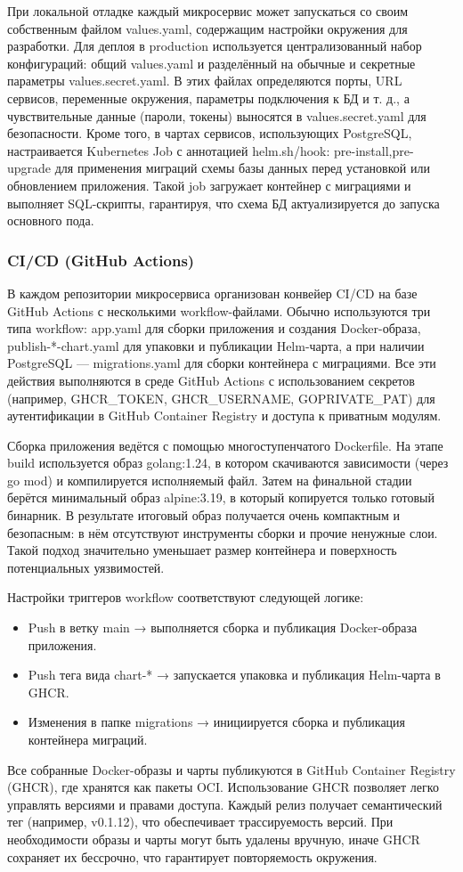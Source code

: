 При локальной отладке каждый микросервис может запускаться со своим собственным файлом values.yaml, содержащим настройки окружения для разработки. Для деплоя в production используется централизованный набор конфигураций: общий values.yaml и разделённый на обычные и секретные параметры values.secret.yaml. В этих файлах определяются порты, URL сервисов, переменные окружения, параметры подключения к БД и т. д., а чувствительные данные (пароли, токены) выносятся в values.secret.yaml для безопасности. Кроме того, в чартах сервисов, использующих PostgreSQL, настраивается Kubernetes Job с аннотацией helm.sh/hook: pre-install,pre-upgrade для применения миграций схемы базы данных перед установкой или обновлением приложения. Такой job загружает контейнер с миграциями и выполняет SQL-скрипты, гарантируя, что схема БД актуализируется до запуска основного пода.

\subsubsection*{CI/CD (GitHub Actions)}
В каждом репозитории микросервиса организован конвейер CI/CD на базе GitHub Actions с несколькими workflow-файлами. Обычно используются три типа workflow: app.yaml для сборки приложения и создания Docker-образа, publish-*-chart.yaml для упаковки и публикации Helm-чарта, а при наличии PostgreSQL — migrations.yaml для сборки контейнера с миграциями. Все эти действия выполняются в среде GitHub Actions с использованием секретов (например, GHCR\_TOKEN, GHCR\_USERNAME, GOPRIVATE\_PAT) для аутентификации в GitHub Container Registry и доступа к приватным модулям.

Сборка приложения ведётся с помощью многоступенчатого Dockerfile. На этапе build используется образ golang:1.24, в котором скачиваются зависимости (через go mod) и компилируется исполняемый файл. Затем на финальной стадии берётся минимальный образ alpine:3.19, в который копируется только готовый бинарник. В результате итоговый образ получается очень компактным и безопасным: в нём отсутствуют инструменты сборки и прочие ненужные слои. Такой подход значительно уменьшает размер контейнера и поверхность потенциальных уязвимостей.

Настройки триггеров workflow соответствуют следующей логике:
\begin{itemize}
    \item Push в ветку main → выполняется сборка и публикация Docker-образа приложения.
    \item Push тега вида chart-* → запускается упаковка и публикация Helm-чарта в GHCR.
    \item Изменения в папке migrations → инициируется сборка и публикация контейнера миграций.
\end{itemize}
Все собранные Docker-образы и чарты публикуются в GitHub Container Registry (GHCR), где хранятся как пакеты OCI. Использование GHCR позволяет легко управлять версиями и правами доступа. Каждый релиз получает семантический тег (например, v0.1.12), что обеспечивает трассируемость версий. При необходимости образы и чарты могут быть удалены вручную, иначе GHCR сохраняет их бессрочно, что гарантирует повторяемость окружения.

